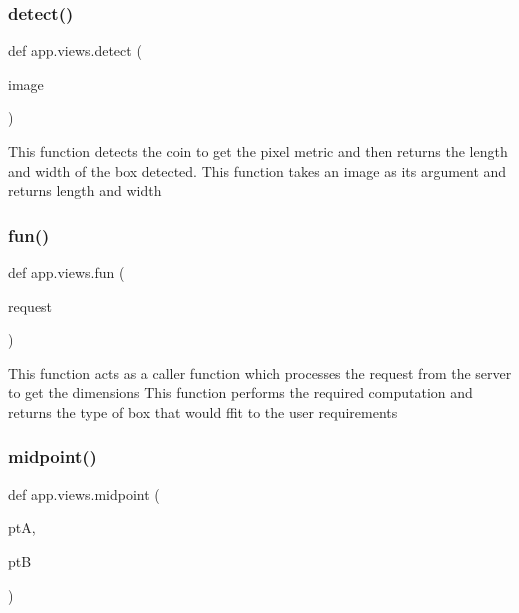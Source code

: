 \subsubsection{\texorpdfstring{detect()}{detect()}}
{\footnotesize\ttfamily def app.\+views.\+detect (\begin{DoxyParamCaption}\item[{}]{image }\end{DoxyParamCaption})}

\begin{DoxyVerb}This function detects the coin to get the pixel metric and then returns the length and width of the box detected.
This function takes an image as its argument and returns length and width
\end{DoxyVerb}
 \mbox{\label{namespaceapp_1_1views_ae9336c0d231671831f86c4d9a43bb32d}} 
\subsubsection{\texorpdfstring{fun()}{fun()}}
{\footnotesize\ttfamily def app.\+views.\+fun (\begin{DoxyParamCaption}\item[{}]{request }\end{DoxyParamCaption})}

\begin{DoxyVerb}This function acts as a caller function which processes the request from the server to get the dimensions
    This function performs the required computation and returns the type of box that would ffit to the user requirements
\end{DoxyVerb}
 \mbox{\label{namespaceapp_1_1views_a0b522eae4299db3dad2d12ea2c2ca990}} 
\subsubsection{\texorpdfstring{midpoint()}{midpoint()}}
{\footnotesize\ttfamily def app.\+views.\+midpoint (\begin{DoxyParamCaption}\item[{}]{ptA,  }\item[{}]{ptB }\end{DoxyParamCaption})}

